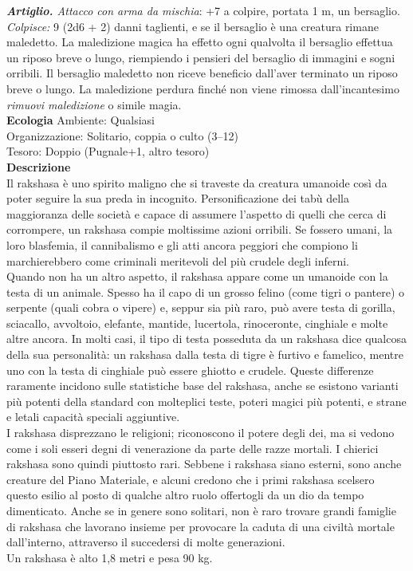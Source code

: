 \begin{multicols}{2}
\emph{\textbf{Artiglio.} Attacco con arma da mischia}: +7 a colpire, portata 1 m, un bersaglio.\\
\emph{Colpisce:} 9 (2d6 + 2) danni taglienti, e se il bersaglio è una creatura rimane maledetto. La maledizione magica ha effetto ogni qualvolta il bersaglio effettua un riposo breve o lungo, riempiendo i pensieri del bersaglio di immagini e sogni orribili. Il bersaglio maledetto non riceve beneficio dall'aver terminato un riposo breve o lungo. La maledizione perdura finché non viene rimossa dall'incantesimo \emph{rimuovi maledizione} o simile magia.\\
\textbf{Ecologia}
Ambiente: Qualsiasi\\
Organizzazione: Solitario, coppia o culto (3–12)\\
Tesoro: Doppio (Pugnale+1, altro tesoro)\\
\textbf{Descrizione}\\
Il rakshasa è uno spirito maligno che si traveste da creatura umanoide così da poter seguire la sua preda in incognito. Personificazione dei tabù della maggioranza delle società e capace di assumere l’aspetto di quelli che cerca di corrompere, un rakshasa compie moltissime azioni orribili. Se fossero umani, la loro blasfemia, il cannibalismo e gli atti ancora peggiori che compiono li marchierebbero come criminali meritevoli del più crudele degli inferni.\\
Quando non ha un altro aspetto, il rakshasa appare come un umanoide con la testa di un animale. Spesso ha il capo di un grosso felino (come tigri o pantere) o serpente (quali cobra o vipere) e, seppur sia più raro, può avere testa di gorilla, sciacallo, avvoltoio, elefante, mantide, lucertola, rinoceronte, cinghiale e molte altre ancora. In molti casi, il tipo di testa posseduta da un rakshasa dice qualcosa della sua personalità: un rakshasa dalla testa di tigre è furtivo e famelico, mentre uno con la testa di cinghiale può essere ghiotto e crudele. Queste differenze raramente incidono sulle statistiche base del rakshasa, anche se esistono varianti più potenti della standard con molteplici teste, poteri magici più potenti, e strane e letali capacità speciali aggiuntive.\\
I rakshasa disprezzano le religioni; riconoscono il potere degli dei, ma si vedono come i soli esseri degni di venerazione da parte delle razze mortali. I chierici rakshasa sono quindi piuttosto rari. Sebbene i rakshasa siano esterni, sono anche creature del Piano Materiale, e alcuni credono che i primi rakshasa scelsero questo esilio al posto di qualche altro ruolo offertogli da un dio da tempo dimenticato. Anche se in genere sono solitari, non è raro trovare grandi famiglie di rakshasa che lavorano insieme per provocare la caduta di una civiltà mortale dall'interno, attraverso il succedersi di molte generazioni.\\
Un rakshasa è alto 1,8 metri e pesa 90 kg.\\


\end{multicols}
